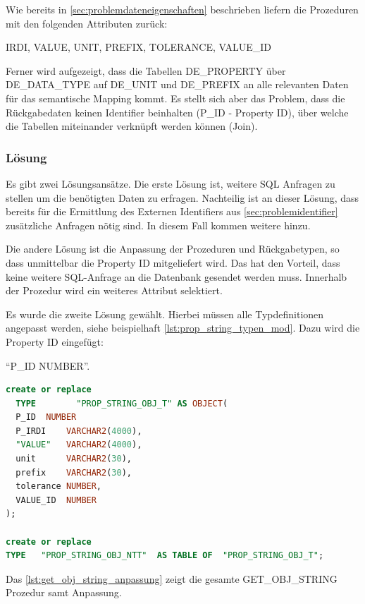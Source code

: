 Wie bereits in \autoref{sec:problemdateneigenschaften} beschrieben liefern die Prozeduren mit den folgenden Attributen zurück: 

IRDI, VALUE, UNIT, PREFIX, TOLERANCE, VALUE\_ID

Ferner wird aufgezeigt, dass die Tabellen DE\_PROPERTY über DE\_DATA\_TYPE auf DE\_UNIT und DE\_PREFIX an alle relevanten Daten für das semantische Mapping kommt. Es stellt sich aber das Problem, dass die Rückgabedaten keinen Identifier beinhalten (P\_ID - Property ID), über welche die Tabellen miteinander verknüpft werden können (Join). 
 
\subsubsection{Lösung}

Es gibt zwei Lösungsansätze. Die erste Lösung ist, weitere SQL Anfragen zu stellen um die benötigten Daten zu erfragen. Nachteilig ist an dieser Lösung, dass bereits für die Ermittlung des Externen Identifiers aus \autoref{sec:problemidentifier} zusätzliche Anfragen nötig sind. In diesem Fall kommen weitere hinzu. 

Die andere Lösung ist die Anpassung der Prozeduren und Rückgabetypen, so dass unmittelbar die Property ID mitgeliefert wird. Das hat den Vorteil, dass keine weitere SQL-Anfrage an die Datenbank gesendet werden muss. Innerhalb der Prozedur wird ein weiteres Attribut selektiert. 

Es wurde die zweite Lösung gewählt. Hierbei müssen alle Typdefinitionen angepasst werden, siehe beispielhaft \autoref{lst:prop_string_typen_mod}. Dazu wird die Property ID eingefügt:

\enquote{P\_ID	 NUMBER}.

 \begin{lstlisting}[caption=PROP\_STRING\_OBJ Typanpassung, language=sql, label=lst:prop_string_typen_mod]
create or replace
  TYPE        "PROP_STRING_OBJ_T" AS OBJECT(
  P_ID	NUMBER
  P_IRDI    VARCHAR2(4000),
  "VALUE"   VARCHAR2(4000),
  unit      VARCHAR2(30),
  prefix    VARCHAR2(30),
  tolerance NUMBER,
  VALUE_ID  NUMBER
);

create or replace
TYPE   "PROP_STRING_OBJ_NTT"  AS TABLE OF  "PROP_STRING_OBJ_T";
\end{lstlisting}

Das \autoref{lst:get_obj_string_anpassung} zeigt die gesamte GET\_OBJ\_STRING Prozedur samt Anpassung. 

